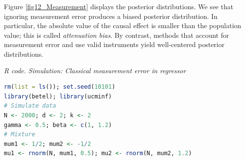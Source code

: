 Figure \ref{fig12_Measurement} displays the posterior distributions. We see that ignoring measurement error produces a biased posterior distribution. In particular, the absolute value of the causal effect is smaller than the population value; this is called \textit{attenuation bias}. By contrast, methods that account for measurement error and use valid instruments yield well-centered posterior distributions.

\begin{tcolorbox}[enhanced,width=4.67in,center upper,
	fontupper=\large\bfseries,drop shadow southwest,sharp corners]
	\textit{R code. Simulation: Classical measurement error in regressor}
	\begin{VF}
		\begin{lstlisting}[language=R]	
rm(list = ls()); set.seed(10101)
library(betel); library(ucminf)
# Simulate data
N <- 2000; d <- 2; k <- 2
gamma <- 0.5; beta <- c(1, 1.2)
# Mixture
mum1 <- 1/2; mum2 <- -1/2
mu1 <- rnorm(N, mum1, 0.5); mu2 <- rnorm(N, mum2, 1.2)
\end{lstlisting}
	\end{VF}
\end{tcolorbox} 


